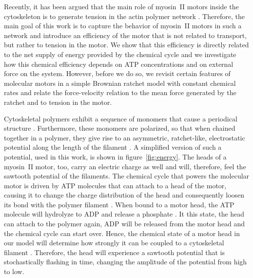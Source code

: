 \documentclass[aps,pre,twocolumn,showpacs,showkeys,superscriptaddress,floatfix]{revtex4-1}
\begin{document}
Recently, it has been argued that the main role of myosin~II motors inside the cytoskeleton is to generate tension in the actin polymer network \cite{ma2012nonmuscle,chugh2017actin,monier2010actomyosin}.
Therefore, the main goal of this work is to capture the behavior of myosin~II motors in such a network 
and introduce an efficiency of the motor that is not related to transport, but rather to tension in the motor.
We show that this efficiency is directly related to the net supply of energy provided by the chemical cycle 
and we investigate how this chemical efficiency depends on ATP concentrations and on external force on the system.
However, before we do so, we revisit certain features of molecular motors in a simple Brownian ratchet model \cite{reimann2002brownian} with constant chemical rates and relate the force-velocity relation to the mean force generated by the ratchet and to tension in the motor.

Cytoskeletal polymers exhibit a sequence of monomers that cause a periodical structure \cite{yogurtcu2012mechanochemical}. 
Furthermore, these monomers are polarized, so that when chained together in a polymer, they give rise to an asymmetric, ratchet-like, electrostatic potential along the length of the filament \cite{Nie2014,nie2014conformational}. 
A simplified version of such a potential, used in this work, is shown in figure~\ref{fig:energy}. 
The heads of a myosin~II motor, too, carry an electric charge as well \cite{barterls1993myosin} and will, therefore, feel the sawtooth potential of the filaments. %
The chemical cycle that powers the molecular motor is driven by ATP molecules that can attach to a head of the motor, causing it to change the charge distribution of the head and consequently loosen its bond with the polymer filament \cite{adelstein1980regulation}. 
When bound to a motor head, the ATP molecule will hydrolyze to ADP and release a phosphate \cite{gajewski1986thermodynamics}. 
It this state, the head can attach to the polymer again, ADP will be released from the motor head and the chemical cycle can start over. 
Hence, the chemical state of a motor head in our model will determine how strongly it can be coupled to a cytoskeletal filament \cite{Nie2014,nie2014conformational}. 
Therefore, the head will experience a sawtooth potential that is stochastically flashing in time, changing the amplitude of the potential from high to low.
\end{document}
